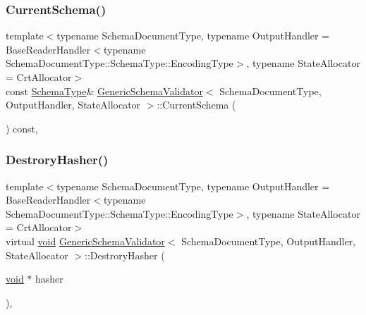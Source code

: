 \mbox{\label{classGenericSchemaValidator_ad00ad0a27d466e975de5e0f104e6962d}} 
\subsubsection{\texorpdfstring{Current\+Schema()}{CurrentSchema()}}
{\footnotesize\ttfamily template$<$typename Schema\+Document\+Type, typename Output\+Handler = Base\+Reader\+Handler$<$typename Schema\+Document\+Type\+::\+Schema\+Type\+::\+Encoding\+Type$>$, typename State\+Allocator = Crt\+Allocator$>$ \\
const \hyperlink{classGenericSchemaValidator_ac79628f00f6720bbabb70b44f0d076a0}{Schema\+Type}\& \hyperlink{classGenericSchemaValidator}{Generic\+Schema\+Validator}$<$ Schema\+Document\+Type, Output\+Handler, State\+Allocator $>$\+::Current\+Schema (\begin{DoxyParamCaption}{ }\end{DoxyParamCaption}) const\hspace{0.3cm}{\ttfamily [inline]}, {\ttfamily [private]}}

\mbox{\label{classGenericSchemaValidator_a007eef58be575dc562543d069ddd2710}} 
\subsubsection{\texorpdfstring{Destrory\+Hasher()}{DestroryHasher()}}
{\footnotesize\ttfamily template$<$typename Schema\+Document\+Type, typename Output\+Handler = Base\+Reader\+Handler$<$typename Schema\+Document\+Type\+::\+Schema\+Type\+::\+Encoding\+Type$>$, typename State\+Allocator = Crt\+Allocator$>$ \\
virtual \hyperlink{imgui__impl__opengl3__loader_8h_ac668e7cffd9e2e9cfee428b9b2f34fa7}{void} \hyperlink{classGenericSchemaValidator}{Generic\+Schema\+Validator}$<$ Schema\+Document\+Type, Output\+Handler, State\+Allocator $>$\+::Destrory\+Hasher (\begin{DoxyParamCaption}\item[{\hyperlink{imgui__impl__opengl3__loader_8h_ac668e7cffd9e2e9cfee428b9b2f34fa7}{void} $\ast$}]{hasher }\end{DoxyParamCaption})\hspace{0.3cm}{\ttfamily [inline]}, {\ttfamily [virtual]}}



